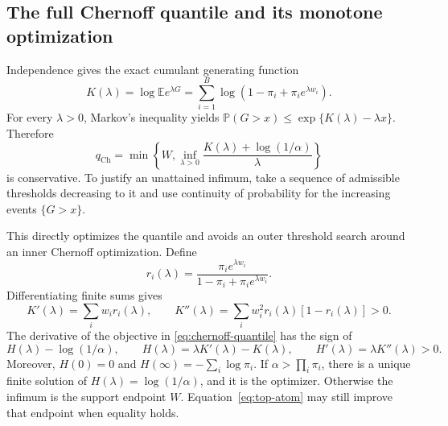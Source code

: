 \documentclass[11pt,letterpaper]{article}
\numberwithin{equation}{section}
\theoremstyle{definition}
\theoremstyle{remark}
\begin{document}
\subsection{The full Chernoff quantile and its monotone optimization}

Independence gives the exact cumulant generating function
\begin{equation}
  K(\lambda)=\log\mathbb{E}e^{\lambda G}
    =\sum_{i=1}^B\log(1-\pi_i+\pi_i e^{\lambda w_i}).
  \label{eq:bernoulli-cgf}
\end{equation}
For every $\lambda>0$, Markov's inequality yields
$\mathbb{P}(G>x)\le\exp\{K(\lambda)-\lambda x\}$.
Therefore
\begin{equation}
  q_{\mathrm{Ch}}=
  \min\left\{W,\inf_{\lambda>0}
    \frac{K(\lambda)+\log(1/\alpha)}{\lambda}\right\}
  \label{eq:chernoff-quantile}
\end{equation}
is conservative. To justify an unattained infimum, take a sequence of
admissible thresholds decreasing to it and use continuity of probability
for the increasing events $\{G>x\}$.

This directly optimizes the quantile and avoids an outer threshold search
around an inner Chernoff optimization. Define
\[
  r_i(\lambda)=
  \frac{\pi_i e^{\lambda w_i}}{1-\pi_i+\pi_i e^{\lambda w_i}}.
\]
Differentiating finite sums gives
\[
  K'(\lambda)=\sum_i w_i r_i(\lambda),\qquad
  K''(\lambda)=\sum_i w_i^2r_i(\lambda)[1-r_i(\lambda)]>0.
\]
The derivative of the objective in \eqref{eq:chernoff-quantile} has the sign of
\begin{equation}
  H(\lambda)-\log(1/\alpha),\qquad
  H(\lambda)=\lambda K'(\lambda)-K(\lambda),\qquad
  H'(\lambda)=\lambda K''(\lambda)>0.
  \label{eq:chernoff-entropy}
\end{equation}
Moreover, $H(0)=0$ and
$H(\infty)=-\sum_i\log\pi_i$. If
$\alpha>\prod_i\pi_i$, there is a unique finite solution of
$H(\lambda)=\log(1/\alpha)$, and it is the optimizer. Otherwise the infimum
is the support endpoint $W$. Equation~\eqref{eq:top-atom} may still improve
that endpoint when equality holds.
\end{document}

